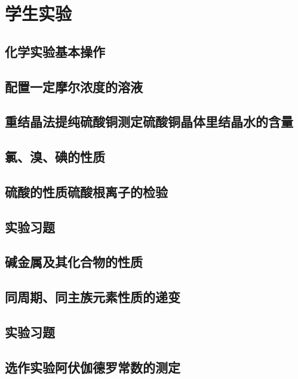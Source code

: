 \chapter*{学生实验}

\section{化学实验基本操作}
\section{配置一定摩尔浓度的溶液}
\section{重结晶法提纯硫酸铜\texorpdfstring{\quad}{ }测定硫酸铜晶体里结晶水的含量}
\section{氯、溴、碘的性质}
\section{硫酸的性质\texorpdfstring{\quad}{ }硫酸根离子的检验}
\section{实验习题}
\section{碱金属及其化合物的性质}
\section{同周期、同主族元素性质的递变}
\section{实验习题}
\section*{选作实验\texorpdfstring{\quad}{ }阿伏伽德罗常数的测定}